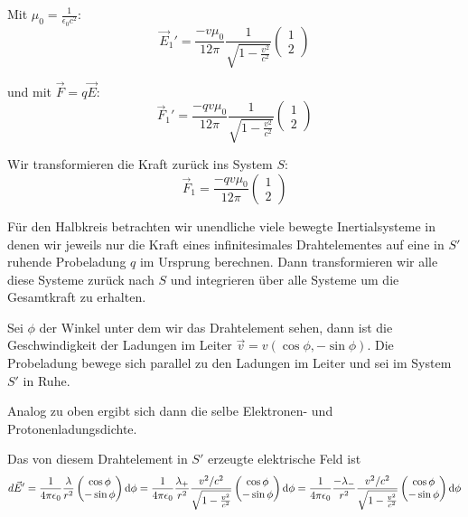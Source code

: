 \documentclass[a4paper,german,12pt,smallheadings]{scrartcl}
\begin{document}
Mit $\mu_0 = \frac{1}{\epsilon_0 c^2}$:
\begin{equation}
  \vec{E}_1'
  = \frac{-v \mu_0}{12 \pi} \frac{1}{\sqrt{1 - \frac{v^2}{c^2}}} \begin{pmatrix} 1 \\ 2 \end{pmatrix}
\end{equation}

und mit $\vec{F} = q\vec{E}$:
\begin{equation}
  \vec{F}_1'
  = \frac{-qv \mu_0}{12 \pi} \frac{1}{\sqrt{1 - \frac{v^2}{c^2}}} \begin{pmatrix} 1 \\ 2 \end{pmatrix}
\end{equation}


Wir transformieren die Kraft zurück ins System $S$:
\begin{equation}
  \vec{F}_1
  = \frac{-qv \mu_0}{12 \pi} \begin{pmatrix} 1 \\ 2 \end{pmatrix}
\end{equation}



Für den Halbkreis betrachten wir unendliche viele bewegte Inertialsysteme in
denen wir jeweils nur die Kraft eines infinitesimales Drahtelementes auf eine
in $S'$ ruhende Probeladung $q$ im Ursprung berechnen. Dann transformieren wir
alle diese Systeme zurück nach $S$ und integrieren über alle Systeme um die
Gesamtkraft zu erhalten.

Sei $\phi$ der Winkel unter dem wir das Drahtelement sehen, dann ist die
Geschwindigkeit der Ladungen im Leiter $\vec{v} = v (\cos \phi, -\sin \phi)$.
Die Probeladung bewege sich parallel zu den Ladungen im Leiter und sei im
System $S'$ in Ruhe.

Analog zu oben ergibt sich dann die selbe Elektronen- und
Protonenladungsdichte.

Das von diesem Drahtelement in $S'$ erzeugte elektrische Feld ist
\begin{equation}
  d \vec{E}' = \frac{1}{4 \pi \epsilon_0} \frac{\lambda}{r^2} \begin{pmatrix} \cos \phi \\ -\sin \phi\end{pmatrix} \dif \phi
            = \frac{1}{4 \pi \epsilon_0} \frac{\lambda_+}{r^2} \frac{v^2/c^2}{\sqrt{1 - \frac{v^2}{c^2}}} \begin{pmatrix} \cos \phi \\ -\sin \phi\end{pmatrix} \dif \phi
            = \frac{1}{4 \pi \epsilon_0} \frac{-\lambda_-}{r^2} \frac{v^2/c^2}{\sqrt{1 - \frac{v^2}{c^2}}} \begin{pmatrix} \cos \phi \\ -\sin \phi\end{pmatrix} \dif \phi
\end{equation}
\end{document}
